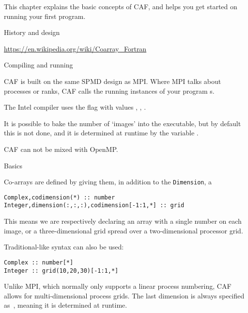 
This chapter explains the basic concepts of
\ac{CAF}, and helps you get
started on running your first program.

 {History and design}

\url{https://en.wikipedia.org/wiki/Coarray_Fortran}

 {Compiling and running}

\ac{CAF} is built on the same \ac{SPMD} design as MPI.
Where MPI talks about processes or ranks, \ac{CAF}
calls the running instances of your program s.

The Intel compiler uses the flag 
with values , ,  .

It is possible to bake the number of `images' into the executable,
but by default this is not done, and it is determined at runtime
by the variable .

\ac{CAF} can not be mixed with OpenMP.

 {Basics}

Co-arrays are defined by giving them, in addition to the \lstinline{Dimension},
a 

\begin{lstlisting}
Complex,codimension(*) :: number
Integer,dimension(:,:,:),codimension[-1:1,*] :: grid  
\end{lstlisting}

This means we are respectively declaring
an array with a single number on each image,
or a three-dimensional grid spread over a two-dimensional processor grid.

Traditional-like syntax can also be used:
\begin{lstlisting}
Complex :: number[*]
Integer :: grid(10,20,30)[-1:1,*]
\end{lstlisting}

Unlike \ac{MPI}, which normally only supports a linear process numbering,
\ac{CAF} allows for multi-dimensional process grids. The last dimension
is always specified as~\n{*}, meaning it is determined at runtime.

